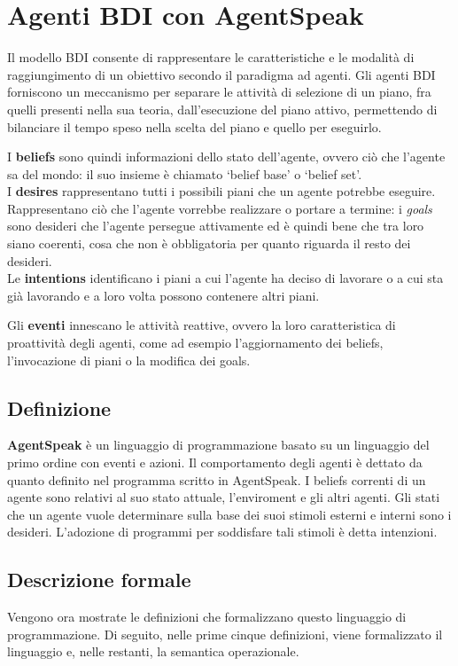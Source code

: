 \section{Agenti BDI con AgentSpeak}
Il modello BDI consente di rappresentare le caratteristiche e le modalit\`a di raggiungimento di un obiettivo secondo il paradigma ad agenti. Gli agenti BDI forniscono un meccanismo per separare le attivit\`a di selezione di un piano, fra quelli presenti nella sua teoria, dall'esecuzione del piano attivo, permettendo di bilanciare il tempo speso nella scelta del piano e quello per eseguirlo.

I \textbf{beliefs} sono quindi informazioni dello stato dell'agente, ovvero ci\`o che l'agente sa del mondo: il suo insieme \`e chiamato `belief base' o `belief set'.
\\
I \textbf{desires} rappresentano tutti i possibili piani che un agente potrebbe eseguire. Rappresentano ci\`o che l'agente vorrebbe realizzare o portare a termine: i \textit{goals} sono desideri che l'agente persegue attivamente ed \`e quindi bene che tra loro siano coerenti, cosa che non \`e obbligatoria per quanto riguarda il resto dei desideri.
\\
Le \textbf{intentions} identificano i piani a cui l'agente ha deciso di lavorare o a cui sta gi\`a lavorando e a loro volta possono contenere altri piani.

Gli \textbf{eventi} innescano le attivit\`a reattive, ovvero la loro caratteristica di proattivit\`a degli agenti, come ad esempio l'aggiornamento dei beliefs, l'invocazione di piani o la modifica dei goals.

\subsection{Definizione}
\textbf{AgentSpeak} \`e un linguaggio di programmazione basato su un linguaggio del primo ordine con eventi e azioni. Il comportamento degli agenti \`e dettato da quanto definito nel programma scritto in AgentSpeak. I beliefs correnti di un agente sono relativi al suo stato attuale, l'enviroment e gli altri agenti. Gli stati che un agente vuole determinare sulla base dei suoi stimoli esterni e interni sono i desideri. L'adozione di programmi per soddisfare tali stimoli \`e detta intenzioni.

\subsection{Descrizione formale}
Vengono ora mostrate le definizioni che formalizzano questo linguaggio di programmazione.
Di seguito, nelle prime cinque definizioni, viene formalizzato il linguaggio e, nelle restanti, la semantica operazionale.

